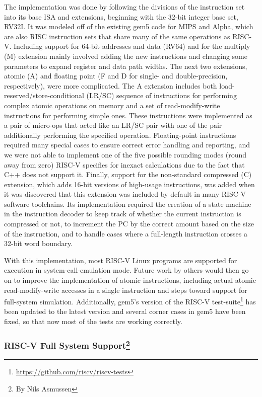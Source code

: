 The implementation was done by following the divisions of the instruction set into its base ISA and extensions, beginning with the 32-bit integer base set, RV32I.
It was modeled off of the existing gem5 code for MIPS and Alpha, which are also RISC instruction sets that share many of the same operations as RISC-V.
Including support for 64-bit addresses and data (RV64) and for the multiply (M) extension mainly involved adding the new instructions and changing some parameters to expand register and data path widths.
The next two extensions, atomic (A) and floating point (F and D for single- and double-precision, respectively), were more complicated.
The A extension includes both load-reserved/store-conditional (LR/SC) sequence of instructions for performing complex atomic operations on memory and a set of read-modify-write instructions for performing simple ones.
These instructions were implemented as a pair of micro-ops that acted like an LR/SC pair with one of the pair additionally performing the specified operation.
Floating-point instructions required many special cases to ensure correct error handling and reporting, and we were not able to implement one of the five possible rounding modes (round away from zero) RISC-V specifies for inexact calculations due to the fact that C++ does not support it.
Finally, support for the non-standard compressed (C) extension, which adds 16-bit versions of high-usage instructions, was added when it was discovered that this extension was included by default in many RISC-V software toolchains.
Its implementation required the creation of a state machine in the instruction decoder to keep track of whether the current instruction is compressed or not, to increment the PC by the correct amount based on the size of the instruction, and to handle cases where a full-length instruction crosses a 32-bit word boundary.

With this implementation, most RISC-V Linux programs are supported for execution in system-call-emulation mode.
Future work by others would then go on to improve the implementation of atomic instructions, including actual atomic read-modify-write accesses in a single instruction and steps toward support for full-system simulation.
Additionally, gem5's version of the RISC-V test-suite\footnote{\url{https://github.com/riscv/riscv-tests}} has been updated to the latest version and several corner cases in gem5 have been fixed, so that now most of the tests are working correctly.

\subsubsection[RISC-V Full System Support]{RISC-V Full System Support\footnote{By Nils Asmussen}}

